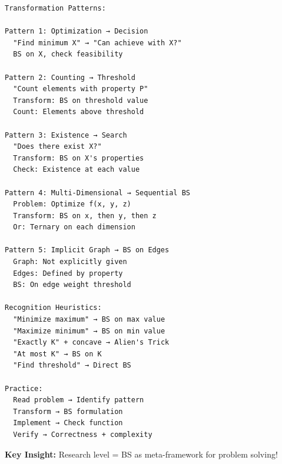 \documentclass[11pt,a4paper,oneside]{book}
\begin{document}
\begin{tcolorbox}[
    enhanced,breakable,
    colback=white,
    colframe=deepblue,
    boxrule=1.5pt,
    arc=3mm,
    title=\textbf{Beyond Traditional Binary Search}
]
\begin{verbatim}
Transformation Patterns:

Pattern 1: Optimization → Decision
  "Find minimum X" → "Can achieve with X?"
  BS on X, check feasibility

Pattern 2: Counting → Threshold
  "Count elements with property P"
  Transform: BS on threshold value
  Count: Elements above threshold

Pattern 3: Existence → Search
  "Does there exist X?"
  Transform: BS on X's properties
  Check: Existence at each value

Pattern 4: Multi-Dimensional → Sequential BS
  Problem: Optimize f(x, y, z)
  Transform: BS on x, then y, then z
  Or: Ternary on each dimension

Pattern 5: Implicit Graph → BS on Edges
  Graph: Not explicitly given
  Edges: Defined by property
  BS: On edge weight threshold

Recognition Heuristics:
  "Minimize maximum" → BS on max value
  "Maximize minimum" → BS on min value
  "Exactly K" + concave → Alien's Trick
  "At most K" → BS on K
  "Find threshold" → Direct BS

Practice:
  Read problem → Identify pattern
  Transform → BS formulation
  Implement → Check function
  Verify → Correctness + complexity
\end{verbatim}

\textbf{Key Insight:}
Research level = BS as meta-framework for problem solving!
\end{tcolorbox}
\end{document}
